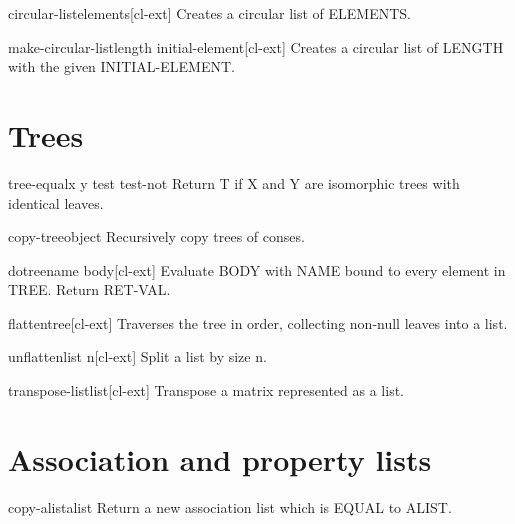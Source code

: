 \documentclass[10pt,english]{book}
\begin{document}
\begin{function}{circular-list}{\rest elements}[cl-ext]
  Creates a circular list of ELEMENTS.
\end{function}

\begin{function}{make-circular-list}{length \key initial-element}[cl-ext]
  Creates a circular list of LENGTH with the given INITIAL-ELEMENT.
\end{function}

\section{Trees}
\label{sec:trees}

\begin{function}{tree-equal}{x y \key test test-not}
  Return T if X and Y are isomorphic trees with identical leaves.
\end{function}

\begin{function}{copy-tree}{object}
  Recursively copy trees of conses.
\end{function}

\begin{macro}{dotree}{name \body body}[cl-ext]
  Evaluate BODY with NAME bound to every element in TREE. Return RET-VAL.
\end{macro}

\begin{function}{flatten}{tree}[cl-ext]
  Traverses the tree in order, collecting non-null leaves into a list.
\end{function}

\begin{function}{unflatten}{list n}[cl-ext]
  Split a list by size n.
\end{function}

\begin{function}{transpose-list}{list}[cl-ext]
  Transpose a matrix represented as a list.
\end{function}

\section{Association and property lists}
\label{sec:association-lists}

\begin{function}{copy-alist}{alist}
  Return a new association list which is EQUAL to ALIST.
\end{function}
\end{document}
